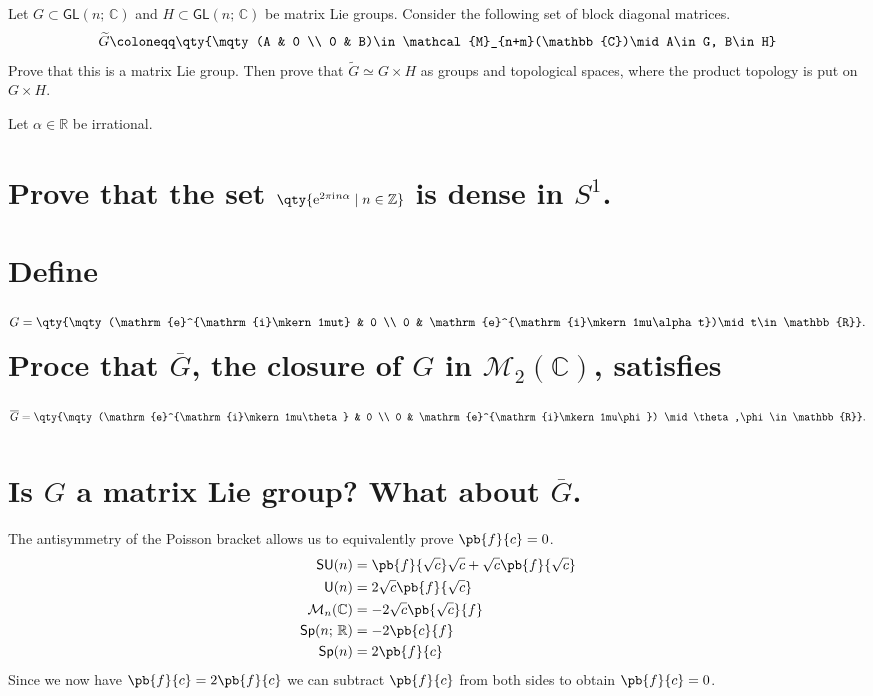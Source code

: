 \documentclass[boxes,pages]{homework}
\newcommand{\Z}{\mathbb{Z}}
\newcommand{\R}{\mathbb{R}}
\newcommand{\C}{\mathbb{C}}
\newcommand{\iu}{\mathrm{i}\mkern1mu}
\newcommand{\e}{\mathrm{e}}
\newcommand{\mats}[2]{\mathcal{M}_{#1}(#2)}
\newcommand{\GL}[2]{\mathsf{GL}(#1;\, #2)}
\newcommand{\U}[1]{\mathsf{U}(#1)}
\newcommand{\SU}[1]{\mathsf{SU}(#1)}
\newcommand{\Sp}[1]{\mathsf{Sp}(#1)}
\newcommand{\Spf}[2]{\mathsf{Sp}(#1;\, #2)}
\begin{document}
\begin{problem}
	Let $G\subset \GL{n}{\C}$ and $H\subset\GL{n}{\C}$ be matrix Lie groups. Consider the following set of block diagonal matrices.
	\[
		\widetilde{G}\coloneqq \qty{\mqty(A & 0 \\ 0 & B)\in\mats{n+m}{\C}\mid A\in G, B\in H}
	\]
	Prove that this is a matrix Lie group. Then prove that $\widetilde{G}\simeq G\times H$ as groups and topological spaces, where the product topology is put on $G\times H$.
\end{problem}

\begin{problem}
	Let $\alpha\in\R$ be irrational.
	\begin{parts}
		\part{Prove that the set $\qty{\e^{2\pi\iu n\alpha}\mid n\in\Z}$ is dense in $S^1$.}
		\part{Define \[G = \qty{\mqty(\e^{\iu t} & 0 \\ 0 & \e^{\iu\alpha t})\mid t\in\R}.\] Proce that $\overline{G}$, the closure of $G$ in $\mats{2}{\C}$, satisfies \[\overline{G} = \qty{\mqty(\e^{\iu\theta} & 0 \\ 0 & \e^{\iu\phi}) \mid \theta,\phi\in\R}.\]}
		\part{Is $G$ a matrix Lie group? What about $\overline{G}$.}
	\end{parts}
\end{problem}

\begin{solution}
	The antisymmetry of the Poisson bracket allows us to equivalently prove $\pb{f}{c} = 0$.
	\begin{align*}
		\SU{n} & = \pb{f}{\sqrt{c}}\sqrt{c} + \sqrt{c}\pb{f}{\sqrt{c}} \\
		         \U{n} & = 2\sqrt{c}\pb{f}{\sqrt{c}}                           \\
		          \mats{n}{\C}& = -2\sqrt{c}\pb{\sqrt{c}}{f}                          \\
		          \Spf{n}{\R} & = -2\pb{c}{f}                                         \\
		          \Sp{n}& = 2\pb{f}{c}
	\end{align*}
	Since we now have $\pb{f}{c} = 2\pb{f}{c}$ we can subtract $\pb{f}{c}$ from both sides to obtain $\pb{f}{c} = 0$.
\end{solution}
\end{document}
